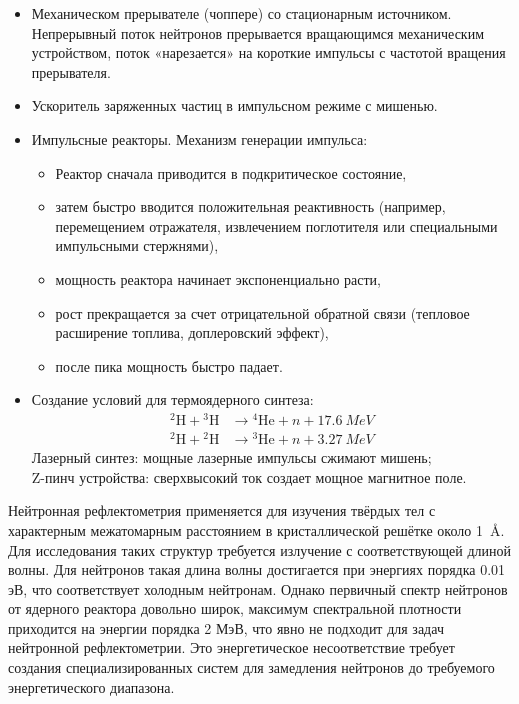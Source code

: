 \documentclass[a4paper]{article}
\begin{document}
\begin{itemize}
    \item Механическом прерывателе (чоппере) со стационарным источником. Непрерывный поток нейтронов прерывается вращающимся механическим устройством, поток «нарезается» на короткие импульсы с частотой вращения прерывателя.
    
    \item Ускоритель заряженных частиц в импульсном режиме с мишенью.
    
    \item Импульсные реакторы. Механизм генерации импульса:
    \begin{itemize}
        \item Реактор сначала приводится в подкритическое состояние,
        \item затем быстро вводится положительная реактивность (например, перемещением отражателя, извлечением поглотителя или специальными импульсными стержнями),
        \item мощность реактора начинает экспоненциально расти,
        \item рост прекращается за счет отрицательной обратной связи (тепловое расширение топлива, доплеровский эффект),
        \item после пика мощность быстро падает.
    \end{itemize}
    
    \item Создание условий для термоядерного синтеза:
    \begin{align*}
        ^2\text{H} + {}^3\text{H} &\to {}^4\text{He} + n + \SI{17.6}{MeV} \\
        ^2\text{H} + {}^2\text{H} &\to {}^3\text{He} + n + \SI{3.27}{MeV}
    \end{align*}
    Лазерный синтез: мощные лазерные импульсы сжимают мишень; \\
    Z-пинч устройства: сверхвысокий ток создает мощное магнитное поле.
\end{itemize}

Нейтронная рефлектометрия применяется для изучения твёрдых тел с характерным межатомарным расстоянием в кристаллической решётке около \SI{1}{\angstrom}. Для исследования таких структур требуется излучение с соответствующей длиной волны. Для нейтронов такая длина волны достигается при энергиях порядка 0.01 эВ, что соответствует холодным нейтронам. Однако первичный спектр нейтронов от ядерного реактора довольно широк, максимум спектральной плотности приходится на энергии порядка 2 МэВ, что явно не подходит для задач нейтронной рефлектометрии. Это энергетическое несоответствие требует создания специализированных систем для замедления нейтронов до требуемого энергетического диапазона.
\end{document}
